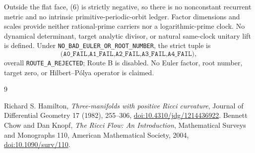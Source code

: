 \documentclass[10pt]{article}
\begin{document}
Outside the flat face, (6) is strictly negative, so there is no nonconstant
recurrent metric and no intrinsic primitive-periodic-orbit ledger.  Factor
dimensions and scales provide neither rational-prime carriers nor a
logarithmic-prime clock.  No dynamical determinant, target analytic divisor,
or natural same-clock unitary lift is defined.  Under
\texttt{NO\_BAD\_EULER\_OR\_ROOT\_NUMBER}, the strict tuple is
\[
 \texttt{(A0\_FAIL,A1\_FAIL,A2\_FAIL,A3\_FAIL,A4\_FAIL)},
\]
overall \texttt{ROUTE\_A\_REJECTED}; Route B is disabled.  No Euler factor,
root number, target zero, or Hilbert--P\'olya operator is claimed.
\fi

\begin{thebibliography}{9}
\raggedright
{} Richard S. Hamilton,
\emph{Three-manifolds with positive Ricci curvature},
Journal of Differential Geometry 17 (1982), 255--306,
\href{https://doi.org/10.4310/jdg/1214436922}{doi:10.4310/jdg/1214436922}.
 Bennett Chow and Dan Knopf,
\emph{The Ricci Flow: An Introduction}, Mathematical Surveys and Monographs
110, American Mathematical Society, 2004,
\href{https://doi.org/10.1090/surv/110}{doi:10.1090/surv/110}.
\end{thebibliography}
\end{document}
